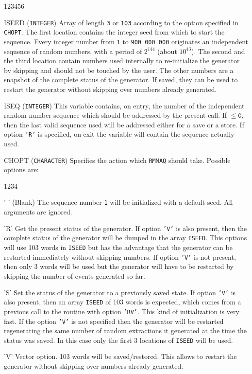 \begin{DLtt}{123456}
\item[ISEED] ({\tt INTEGER}) Array of length {\tt 3} or {\tt 103}
according to the option specified in {\tt CHOPT}. The first location
contains the integer seed from which to start the sequence.
Every integer number from {\tt 1} to {\tt 900 000 000} originates an
independent sequence of random numbers, with a period of $2^{144}$
(about $10^{43}$). The second and the third location contain numbers
used internally to re-initialize the generator by skipping and should
not be touched by the user. The other numbers are a snapshot of the
complete status of the generator. If saved, they can be used to
restart the generator without skipping over numbers already generated.
\item[ISEQ] ({\tt INTEGER}) This variable contains, on entry,
the number of the independent random number sequence which should be
addressed by the present call. If $\mathtt{\leq 0}$, then the last valid
sequence used will be addressed either for a save or a store. If option
{\tt 'R'} is specified, on exit the variable will contain the sequence
actually used.
\item[CHOPT] ({\tt CHARACTER}) Specifies the action which {\tt RMMAQ}
should take. Possible options are:
\begin{DLtt}{1234}
\item[' '] (Blank) The sequence number {\tt 1} will be initialized
with a default seed. All arguments are ignored.
\item['R'] Get the present status of the generator. If option {\tt 'V'}
is also present, then the complete status of the generator will be dumped
in the array {\tt ISEED}. This options will use 103 words in {\tt ISEED}
but has the advantage that the generator can be restarted immediately
without skipping numbers.
If option {\tt 'V'} is not present, then only 3 words will be used but
the generator will have to be restarted by skipping the number
of events generated so far.
\item['S'] Set the status of the generator to a previously saved state.
If option {\tt 'V'} is also present, then an array {\tt ISEED} of 103
words is expected, which comes from a previous call to the routine with
option {\tt 'RV'}. This kind of initialization is very fast. If the
option {\tt 'V'} is not specified
then the generator will be restarted regenerating the same number
of random extractions it generated at the time the status was saved.
In this case only the first 3 locations of {\tt ISEED} will be used.
\item['V'] Vector option. 103 words will be saved/restored. This allows
to restart the generator without skipping
over numbers already generated.
\end{DLtt}
\end{DLtt}

